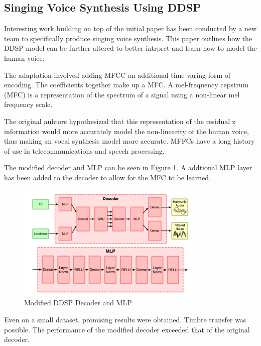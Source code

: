 \subsection{Singing Voice Synthesis Using DDSP}
\label{sec:singing_voice_synthesis}

Interesting work building on top of the initial paper has been conducted by a new team to specifically produce singing voice synthesis\cite{SingingDDSP}. This paper outlines how the DDSP model can be further altered to better intrpret and learn how to model the human voice.

The adaptation involved adding \acrfull{MFCC} an additional time varing form of encoding. The coefficients together make up a \acrfull{MFC}. A mel-frequency cepstrum (MFC) is a representation of the spectrum of a signal using a non-linear mel frequency scale.

The original auhtors hypothesized that this representation of the residual z information would more accurately model the non-linearity of the human voice, thus making an vocal synthesis model more accurate. MFFCs have a long history of use in telecommunications and speech processing\cite{MFCCHistory}.

The modified decoder and MLP can be seen in Figure \ref{fig:singing_decoder_mlp}. A addtional MLP layer has been added to the decoder to allow for the MFC to be learned.

\begin{figure}
    \centering
    \includegraphics[width=0.8\textwidth]{literature_review/SingingDecoderMLP.png}
    \caption{Modified DDSP Decoder and MLP\cite{SingingDDSP}}
    \label{fig:singing_decoder_mlp}
\end{figure}

Even on a small dataset, promising results were obtained. Timbre transfer was possible. The performance of the modified decoder exceeded that of the original decoder.


